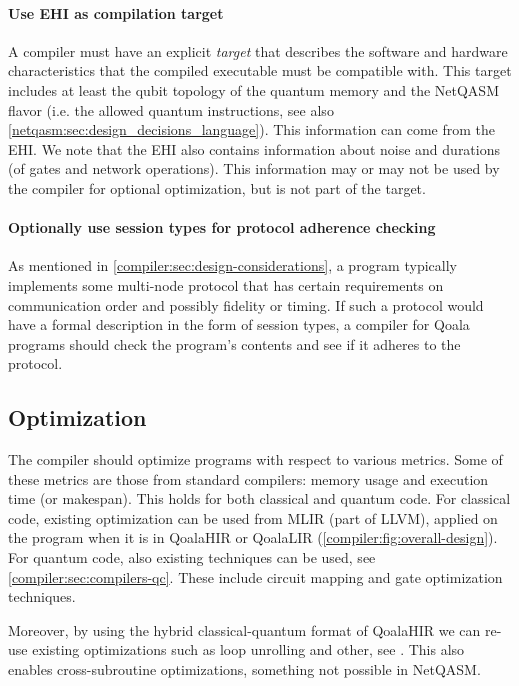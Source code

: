 \paragraph{Use EHI as compilation target}
A compiler must have an explicit \emph{target} that describes the software and hardware characteristics that the compiled executable must be compatible with.
This target includes at least the qubit topology of the quantum memory and the NetQASM flavor (i.e. the allowed quantum instructions, see also \cref{netqasm:sec:design_decisions_language}).
This information can come from the \ac{EHI}.
We note that the \ac{EHI} also contains information about noise and durations (of gates and network operations).
This information may or may not be used by the compiler for optional optimization, but is not part of the target.

\paragraph{Optionally use session types for protocol adherence checking}
As mentioned in \cref{compiler:sec:design-considerations}, a program typically implements some multi-node protocol that has certain requirements on communication order and possibly fidelity or timing.
If such a protocol would have a formal description in the form of session types, a compiler for Qoala programs should check the program's contents and see if it adheres to the protocol.

\subsection{Optimization}
The compiler should optimize programs with respect to various metrics.
Some of these metrics are those from standard compilers: memory usage and execution time (or makespan).
This holds for both classical and quantum code.
For classical code, existing optimization can be used from MLIR (part of LLVM), applied on the program when it is in QoalaHIR or QoalaLIR (\cref{compiler:fig:overall-design}).
For quantum code, also existing techniques can be used, see \cref{compiler:sec:compilers-qc}.
These include circuit mapping and gate optimization techniques.

Moreover, by using the hybrid classical-quantum format of QoalaHIR we can re-use existing optimizations such as loop unrolling and other, see \cite{mccaskey_mlir_2021, ittah_enabling_2022, nguyen_retargetable_2022, peduri_qssa_2022}.
This also enables cross-subroutine optimizations, something not possible in NetQASM.

